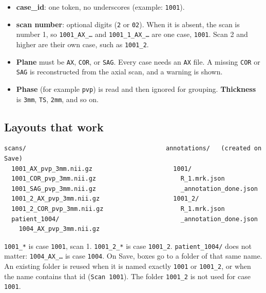 \documentclass[10pt,a4paper]{article}
\begin{document}
\vspace{-0.15cm}
\begin{itemize}[leftmargin=1.3em, itemsep=1pt, topsep=2pt]
    \item \textbf{case\_id}: one token, no underscores (example: \texttt{1001}).
    \item \textbf{scan number}: optional digits (\texttt{2} or \texttt{02}). When it is absent, the scan is number 1, so \texttt{1001\_AX\_\ldots} and \texttt{1001\_1\_AX\_\ldots} are one case, \texttt{1001}. Scan 2 and higher are their own case, such as \texttt{1001\_2}.
    \item \textbf{Plane} must be \texttt{AX}, \texttt{COR}, or \texttt{SAG}. Every case needs an \texttt{AX} file. A missing \texttt{COR} or \texttt{SAG} is reconstructed from the axial scan, and a warning is shown.
    \item \textbf{Phase} (for example \texttt{pvp}) is read and then ignored for grouping. \textbf{Thickness} is \texttt{3mm}, \texttt{TS}, \texttt{2mm}, and so on.
\end{itemize}

\subsection*{Layouts that work}
{\footnotesize
\begin{verbatim}
scans/                                      annotations/   (created on Save)
  1001_AX_pvp_3mm.nii.gz                      1001/
  1001_COR_pvp_3mm.nii.gz                       R_1.mrk.json
  1001_SAG_pvp_3mm.nii.gz                       _annotation_done.json
  1001_2_AX_pvp_3mm.nii.gz                    1001_2/
  1001_2_COR_pvp_3mm.nii.gz                     R_1.mrk.json
  patient_1004/                                 _annotation_done.json
    1004_AX_pvp_3mm.nii.gz
\end{verbatim}
}
\vspace{-0.35cm}
{\small
\texttt{1001\_*} is case \texttt{1001}, scan 1. \texttt{1001\_2\_*} is case \texttt{1001\_2}. \texttt{patient\_1004/} does not matter: \texttt{1004\_AX\_\ldots} is case \texttt{1004}.
On Save, boxes go to a folder of that same name. An existing folder is reused when it is named exactly \texttt{1001} or \texttt{1001\_2}, or when the name contains that id (\texttt{Scan 1001}). The folder \texttt{1001\_2} is not used for case \texttt{1001}.
\par}
\end{document}
